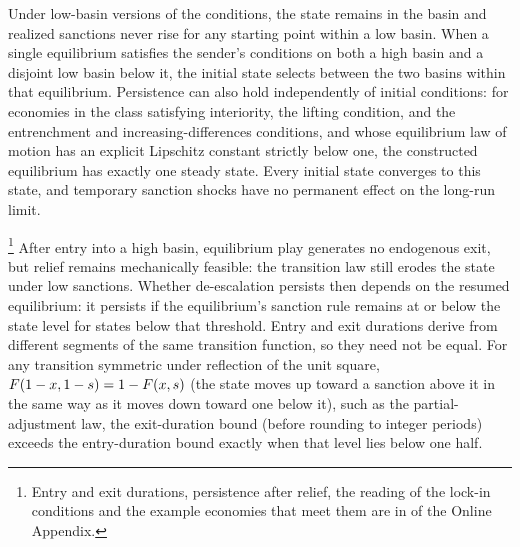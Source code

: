  Under low-basin versions of the conditions, the state
remains in the basin and realized sanctions never rise for any starting point within
a low basin. When a single equilibrium satisfies the sender's conditions on
both a high basin and a disjoint low basin below it, the initial state selects between
the two basins within that equilibrium. Persistence can also hold independently of
initial conditions: for economies in the class satisfying interiority, the lifting
condition, and the entrenchment and increasing-differences conditions, and whose
equilibrium law of motion has an explicit Lipschitz constant strictly below one, the
constructed equilibrium has exactly one steady state. Every initial state converges to
this state, and temporary sanction shocks have no permanent effect on the long-run
limit.

\label{sec:discussion:persistence}
\footnote{Entry and exit durations, persistence after relief, the reading of the
lock-in conditions and the example economies that meet them are in
 of the Online
Appendix.} After entry into a
high basin, equilibrium play generates no endogenous exit, but relief remains
mechanically feasible: the transition law still erodes the state under low sanctions.
Whether de-escalation persists then depends on the resumed equilibrium: it persists
if the equilibrium's sanction rule remains at or below the state level for states
below that threshold. Entry and exit durations derive from different segments of the same transition
function, so they need not be equal. For any transition symmetric under reflection of
the unit square, $F(1-x,1-s)=1-F(x,s)$ (the state moves up toward a sanction above it in the same way as
it moves down toward one below it), such as the partial-adjustment law, the
exit-duration bound (before rounding to integer periods) exceeds the entry-duration
bound
exactly when that level lies below one half.

